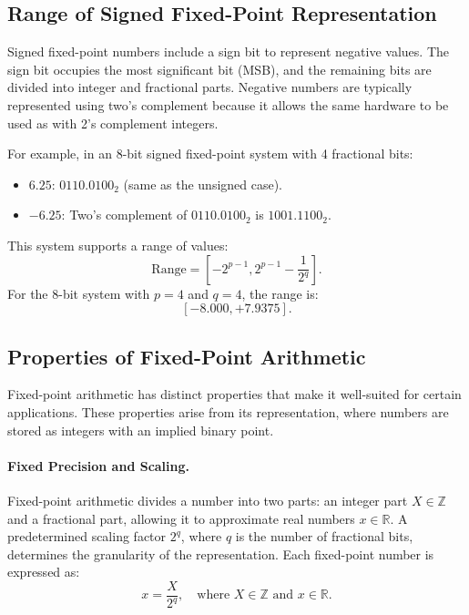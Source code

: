\subsection{Range of Signed Fixed-Point Representation}
Signed fixed-point numbers include a sign bit to represent negative values. The sign bit occupies the most significant bit (MSB), and the remaining bits are divided into integer and fractional parts. Negative numbers are typically represented using two's complement because it allows the same hardware to be used as with 2's complement integers.

For example, in an 8-bit signed fixed-point system with 4 fractional bits:
\begin{itemize}[noitemsep]
    \item \( 6.25 \): \( 0110.0100_2 \) (same as the unsigned case).
    \item \( -6.25 \): Two's complement of \( 0110.0100_2 \) is \( 1001.1100_2 \).
\end{itemize}

This system supports a range of values:
\[
\text{Range} = \left[ -2^{p-1}, 2^{p-1} - \frac{1}{2^q} \right].
\]
For the 8-bit system with \( p = 4 \) and \( q = 4 \), the range is:
\[
[-8.000, +7.9375].
\]

\subsection{Properties of Fixed-Point Arithmetic}

Fixed-point arithmetic has distinct properties that make it well-suited for certain applications. These properties arise from its representation, where numbers are stored as integers with an implied binary point. 

\paragraph{Fixed Precision and Scaling.}

Fixed-point arithmetic divides a number into two parts: an integer part \( X \in \mathbb{Z} \) and a fractional part, allowing it to approximate real numbers \( x \in \mathbb{R} \). A predetermined scaling factor \( 2^q \), where \( q \) is the number of fractional bits, determines the granularity of the representation. Each fixed-point number is expressed as:
\[
x = \frac{X}{2^q}, \quad \text{where } X \in \mathbb{Z} \text{ and } x \in \mathbb{R}.
\]

